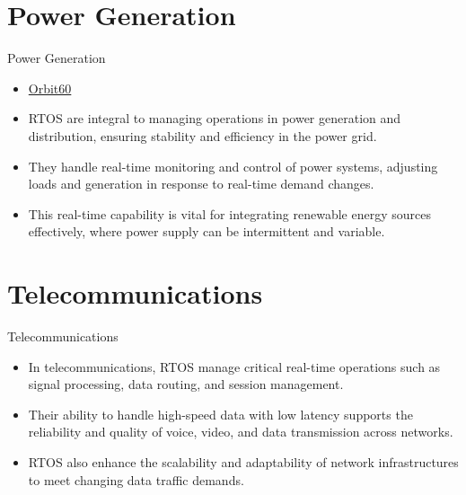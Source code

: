 \documentclass[10pt]{beamer}
\begin{document}
\section{Power Generation}
\begin{frame}{Power Generation}
    \begin{itemize}
        \item \href{https://www.bakerhughes.com/bently-nevada/monitoring-systems/machinery-protection/orbit-60-series}{Orbit60}
        \item RTOS are integral to managing operations in power generation and distribution, ensuring stability and efficiency in the power grid.
        \item They handle real-time monitoring and control of power systems, adjusting loads and generation in response to real-time demand changes.
        \item This real-time capability is vital for integrating renewable energy sources effectively, where power supply can be intermittent and variable.
    \end{itemize}
\end{frame}
\section{Telecommunications}
\begin{frame}{Telecommunications}
    \begin{itemize}
        \item In telecommunications, RTOS manage critical real-time operations such as signal processing, data routing, and session management.
        \item Their ability to handle high-speed data with low latency supports the reliability and quality of voice, video, and data transmission across networks.
        \item RTOS also enhance the scalability and adaptability of network infrastructures to meet changing data traffic demands.
    \end{itemize}
\end{frame}
\end{document}
